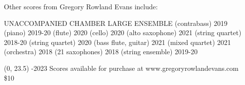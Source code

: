 \documentclass[11pt]{article}
\begin{document}

\begin{center}
\fontsize{.6cm}{1em}\selectfont Other scores from Gregory Rowland Evans include: \hfill
\end{center}
\vspace*{4\baselineskip}
{
\begin{center}
\setlength{\columnseprule}{1pt}
\setlength{\columnsep}{6em}

\begin{paracol}{3}
\fontsize{.3cm}{1em}\selectfont UNACCOMPANIED
\switchcolumn[1]
\fontsize{.3cm}{1em}\selectfont CHAMBER
\switchcolumn[2]
\fontsize{.3cm}{1em}\selectfont LARGE ENSEMBLE
\switchcolumn[0]
\fontsize{.1cm}{0.5em}  (contrabass) 2019
\switchcolumn[0]
\fontsize{.1cm}{0.5em}  (piano) 2019-20
\switchcolumn[0]
\fontsize{.1cm}{0.5em}  (flute) 2020
\switchcolumn[0]
\fontsize{.1cm}{0.5em}  (cello) 2020
\switchcolumn[0]
\fontsize{.1cm}{0.5em}  (alto saxophone) 2021
\switchcolumn[1]
\fontsize{.1cm}{0.5em}  (string quartet) 2018-20
\switchcolumn[1]
\fontsize{.1cm}{0.5em}  (string quartet) 2020
\switchcolumn[1]
\fontsize{.1cm}{0.5em}  (bass flute, guitar) 2021
\switchcolumn[1]
\fontsize{.1cm}{0.5em}  (mixed quartet) 2021
\switchcolumn[2]
\fontsize{.1cm}{0.5em}  (orchestra) 2018
\switchcolumn[2]
\fontsize{.1cm}{0.5em}  (21 saxophones) 2018
\switchcolumn[2]
\fontsize{.1cm}{0.5em}  (string ensemble) 2019-20


\end{paracol}
\end{center}
}

\begin{textblock}{23}(0, 23.5)
-2023 \hfill
Scores available for purchase at www.gregoryrowlandevans.com \hfill
\$10
\end{textblock}
\end{document}
